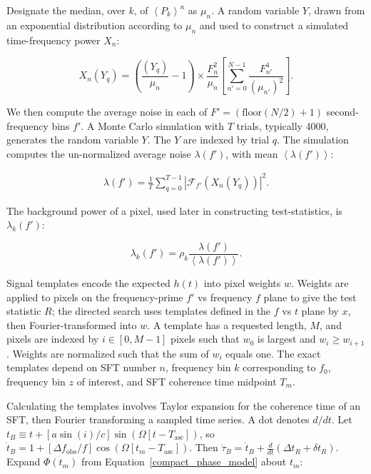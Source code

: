 \documentclass[12pt]{iopart}
\begin{document}
\noindent Designate the median, over $k$, of $\left<P_k\right>^n$ as $\mu_n$.
A random variable $Y$, drawn from an exponential distribution according to $\mu_n$ and used to construct a simulated time-frequency power $X_n$:

\begin{equation}
X_n(Y_q) = \left(\frac{(Y_q)}{\mu_n} - 1 \right) \times \frac{F_n^2}{\mu_n} \left[ \sum\limits_{n'=0}^{N-1} \frac{F_{n'}^4}{(\mu_{n'})^2} \right].
\end{equation}

\noindent We then compute the average noise in each of $F' = (\mathrm{floor}(N/2) +1)$ second-frequency bins $f'$.
A Monte Carlo simulation with $T$ trials, typically 4000, generates the random variable $Y$.
The $Y$ are indexed by trial $q$.  
The simulation computes the un-normalized average noise $\lambda(f')$, with mean $\left< \lambda(f') \right>$:

\begin{eqnarray}
\lambda(f') = \frac{1}{T} \sum_{q=0}^{T-1}|\mathcal{F}_{f'}\left(X_n (Y_q)\right)|^2.
\end{eqnarray}

\noindent The background power of a pixel, used later in constructing test-statistics, is $\lambda_k(f')$:

\begin{equation}
\lambda_k(f') = \rho_k \frac{\lambda(f')}{\left< \lambda(f') \right>}.
\end{equation}

Signal templates encode the expected $h(t)$ into pixel weights $w$. 
Weights are applied to pixels on the frequency-prime $f'$ vs frequency $f$ plane to give the test statistic $R$; the directed search uses templates defined in the $f$ vs $t$ plane by $x$, then Fourier-transformed into $w$. 
A template has a requested length, $M$, and pixels are indexed by $i \in [0,M-1]$ pixels such that $w_0$ is largest and $w_i \geq w_{i+1}$.
Weights are normalized such that the sum of $w_i$ equals one.
The exact templates depend on SFT number $n$, frequency bin $k$ corresponding to $f_0$, frequency bin $z$ of interest, and SFT coherence time midpoint $T_m$.

Calculating the templates involves Taylor expansion for the coherence time of an SFT, then Fourier transforming a sampled time series.
A dot denotes $d/dt$.
Let $t_B \equiv t + [a \sin (i)/c]\sin(\Omega[t-T_\mathrm{asc}])$, so $\dot{t}_B = 1 + [\Delta f_\mathrm{obs}/f] \cos(\Omega [t_m-T_\mathrm{asc}])$.
Then $\dot{\tau}_B = \dot{t}_B + \frac{d}{dt}(\Delta t_R +\delta t_R)$.
Expand $\Phi(t_m)$ from Equation~\ref{compact_phase_model} about $t_m$:
\end{document}
